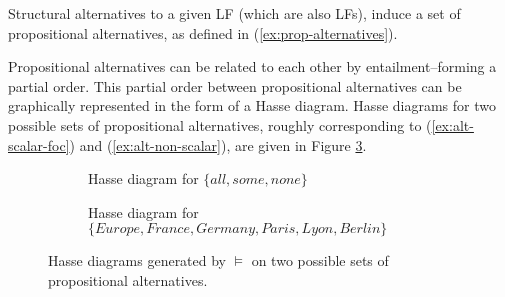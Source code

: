 Structural alternatives to a given LF (which are also LFs), induce a set of propositional alternatives, as defined in (\ref{ex:prop-alternatives}).

\begin{exe}
	\label{ex:prop-alternatives}
\end{exe}

Propositional alternatives can be related to each other by entailment--forming a partial order. This partial order between propositional alternatives can be graphically represented in the form of a Hasse diagram. Hasse diagrams for two possible sets of propositional alternatives, roughly corresponding to (\ref{ex:alt-scalar-foc}) and (\ref{ex:alt-non-scalar}), are given in Figure \ref{fig:hasse}.

\begin{figure}[H]
	\centering
	\begin{subfigure}[t]{.45\linewidth}
		\centering
		\caption{Hasse diagram for $\lbrace \textit{all}, \textit{some}, \textit{none} \rbrace$}\label{fig:hasse-scalar} 
	\end{subfigure}	
	\hfill
	\begin{subfigure}[t]{.45\linewidth}
		\centering
		\caption{Hasse diagram for $\lbrace \textit{Europe}, \textit{France}, \textit{Germany}, \textit{Paris}, \textit{Lyon}, \textit{Berlin} \rbrace$}\label{fig:hasse-locations}
	\end{subfigure}
	\caption{Hasse diagrams generated by $\vDash$ on two possible sets of propositional alternatives.}\label{fig:hasse}
\end{figure}

